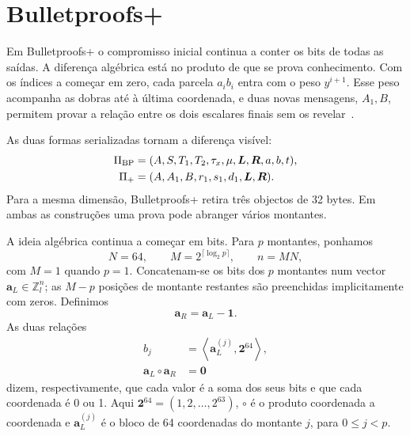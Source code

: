 \section{Bulletproofs+}
\label{sec:bulletproof_plus}

%
Em Bulletproofs+ o compromisso inicial continua a conter os bits de
todas as saídas. A diferença algébrica está no produto de que se prova
conhecimento. Com os índices a começar em zero, cada parcela
\(a_i b_i\) entra com o peso \(y^{i+1}\). Esse peso acompanha as
dobras até à última coordenada, e duas novas mensagens, \(A_1,B\),
permitem provar a relação entre os dois escalares finais sem os
revelar~\cite{bulletproofs-plus-paper}.

As duas formas serializadas tornam a diferença visível:
\begin{align*}
 \Pi_{\rm BP}
  &=(A,S,T_1,T_2,\tau_x,\mu,
     \boldsymbol L,\boldsymbol R,a,b,t),\\
 \Pi_+
  &=(A,A_1,B,r_1,s_1,d_1,
     \boldsymbol L,\boldsymbol R).
\end{align*}
Para a mesma dimensão, Bulletproofs+ retira três objectos de 32 bytes. Em ambas as construções uma prova pode abranger vários montantes.

A ideia algébrica continua a começar em bits. Para \(p\) montantes, ponhamos
\[
 N=64,\qquad
 M=2^{\lceil\log_2 p\rceil},\qquad
 n=MN,
\]
com \(M=1\) quando \(p=1\). Concatenam-se os bits dos \(p\) montantes num
vector \(\boldsymbol a_L\in\mathbb Z_l^n\); as \(M-p\) posições de montante
restantes são preenchidas implicitamente com zeros. Definimos
\[
 \boldsymbol a_R=\boldsymbol a_L-\boldsymbol 1.
\]
As duas relações
\begin{align}
 b_j&=\left\langle
   \boldsymbol a_L^{(j)},\boldsymbol 2^{64}\right\rangle,
   \label{eq:bp-value-bits}\\
 \boldsymbol a_L\circ\boldsymbol a_R&=\boldsymbol 0
   \label{eq:bp-bit-constraint}
\end{align}
dizem, respectivamente, que cada valor é a soma dos seus bits e que cada
coordenada é 0 ou 1. Aqui
\(\boldsymbol 2^{64}=(1,2,\ldots,2^{63})\), \(\circ\) é o produto coordenada a
coordenada e \(\boldsymbol a_L^{(j)}\) é o bloco de 64 coordenadas do montante
\(j\), para \(0\leq j<p\).

